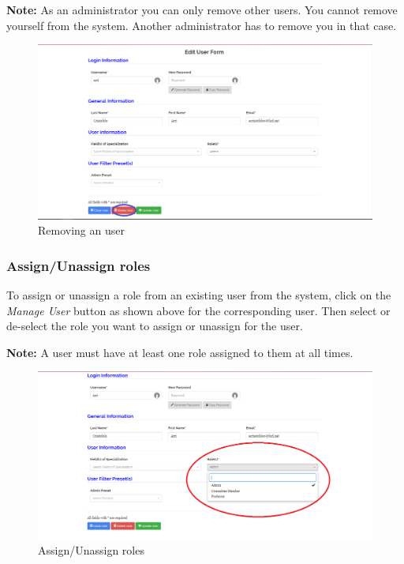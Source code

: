\documentclass[fontsize=12pt,paper=letter,twoside]{scrartcl}
\begin{document}
\smallskip
\noindent \textbf{Note:} As an administrator you can only remove other users. You cannot remove yourself from the system. Another administrator has to remove you in that case.

\begin{figure}[!htb]
\begin{center}
\includegraphics[width=.99\textwidth]{images/mu/remove_user.png}
\end{center}
\caption{Removing an user}
\label{fig:remove_user}
\end{figure}

\clearpage
\subsubsection{Assign/Unassign roles}
To assign or unassign a role from an existing user from the system, click on the \emph{Manage User} button as shown above for the corresponding user. Then select or de-select the role you want to assign or unassign for the user.

\smallskip
\noindent \textbf{Note:} A user must have at least one role assigned to them at all times.

\begin{figure}[!htb]
\begin{center}
\includegraphics[width=.99\textwidth]{images/mu/edit_roles.png}
\end{center}
\caption{Assign/Unassign roles}
\label{fig:edit_roles}
\end{figure}
\end{document}
